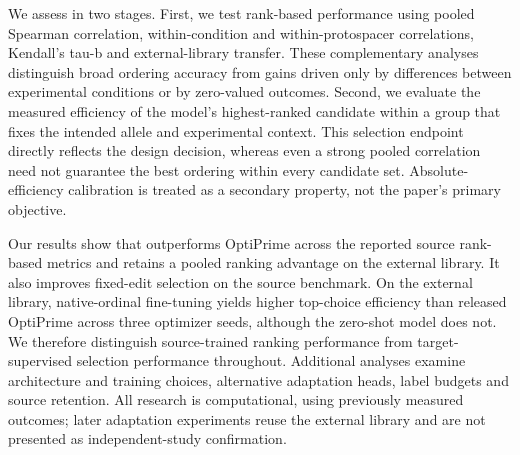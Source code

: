 We assess \model{} in two stages. First, we test rank-based performance using pooled Spearman correlation, within-condition and within-protospacer correlations, Kendall's tau-b and external-library transfer. These complementary analyses distinguish broad ordering accuracy from gains driven only by differences between experimental conditions or by zero-valued outcomes. Second, we evaluate the measured efficiency of the model's highest-ranked candidate within a group that fixes the intended allele and experimental context. This selection endpoint directly reflects the design decision, whereas even a strong pooled correlation need not guarantee the best ordering within every candidate set. Absolute-efficiency calibration is treated as a secondary property, not the paper's primary objective.

Our results show that \model{} outperforms OptiPrime across the reported source rank-based metrics and retains a pooled ranking advantage on the external library. It also improves fixed-edit selection on the source benchmark. On the external library, native-ordinal fine-tuning yields higher top-choice efficiency than released OptiPrime across three optimizer seeds, although the zero-shot model does not. We therefore distinguish source-trained ranking performance from target-supervised selection performance throughout. Additional analyses examine architecture and training choices, alternative adaptation heads, label budgets and source retention. All research is computational, using previously measured outcomes; later adaptation experiments reuse the external library and are not presented as independent-study confirmation.
